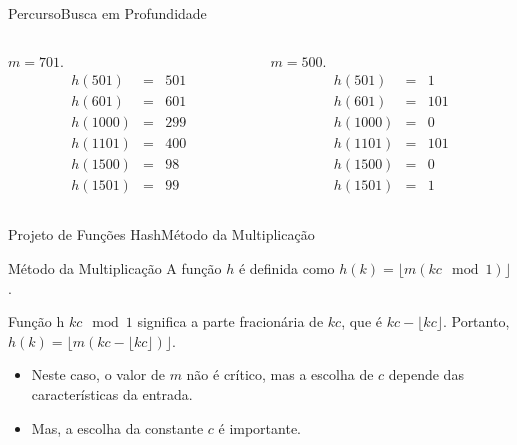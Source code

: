 \documentclass[aspectratio=169]{beamer}
\begin{document}
\begin{frame}{Percurso}{Busca em Profundidade}
\begin{columns}
\begin{column}{0.5\textwidth}
  \begin{center}
  $m = 701$.
  \begin{eqnarray}
  h(501) &=& 501 \nonumber\\
  h(601) &=& 601 \nonumber\\
  h(1000) &=& 299 \nonumber\\
  h(1101) &=& 400 \nonumber\\
  h(1500) &=& 98 \nonumber\\
  h(1501) &=& 99 \nonumber
  \end{eqnarray}
  \end{center}
\end{column}
\begin{column}{0.5\textwidth}  
  \begin{center}
  
  $m = 500$.
  \begin{eqnarray}
  h(501) &=& 1 \nonumber\\
  h(601) &=& 101 \nonumber\\
  h(1000) &=&  0 \nonumber\\
  h(1101) &=& 101 \nonumber\\
  h(1500) &=& 0 \nonumber\\
  h(1501) &=& 1 \nonumber
  \end{eqnarray}
  \end{center}
\end{column}
\end{columns}
\end{frame}



\begin{frame}{Projeto de Funções Hash}{Método da Multiplicação}
\begin{block}{Método da Multiplicação}
A função $h$ é definida como $h(k) = \lfloor m(kc \mod 1) \rfloor $.
\end{block}
\begin{block}{Função h}
$k c \mod 1$ significa a parte fracionária de $kc$, que é $kc - \lfloor kc \rfloor$. Portanto, $h(k) = \lfloor m (kc - \lfloor kc \rfloor ) \rfloor $.
\end{block}
 \begin{itemize}
 \item Neste caso, o valor de $m$ não é crítico, mas a escolha de $c$ depende das características da entrada.
 \item Mas, a escolha da constante $c$ é importante. 
 \end{itemize}
\end{frame}
\end{document}
